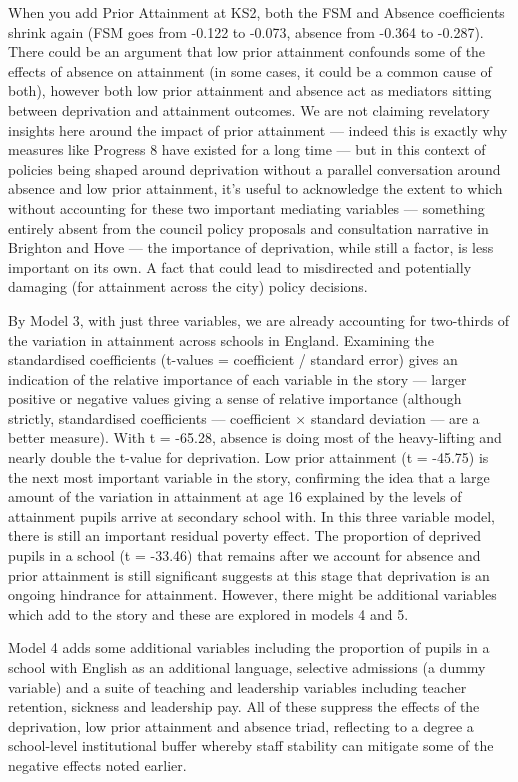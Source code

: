 \documentclass[
  11pt,
]{article}
\begin{document}
When you add Prior Attainment at KS2, both the FSM and Absence
coefficients shrink again (FSM goes from -0.122 to -0.073, absence from
-0.364 to -0.287). There could be an argument that low prior attainment
confounds some of the effects of absence on attainment (in some cases,
it could be a common cause of both), however both low prior attainment
and absence act as mediators sitting between deprivation and attainment
outcomes. We are not claiming revelatory insights here around the impact
of prior attainment --- indeed this is exactly why measures like
Progress 8 have existed for a long time --- but in this context of
policies being shaped around deprivation without a parallel conversation
around absence and low prior attainment, it's useful to acknowledge the
extent to which without accounting for these two important mediating
variables --- something entirely absent from the council policy
proposals and consultation narrative in Brighton and Hove --- the
importance of deprivation, while still a factor, is less important on
its own. A fact that could lead to misdirected and potentially damaging
(for attainment across the city) policy decisions.

By Model 3, with just three variables, we are already accounting for
two-thirds of the variation in attainment across schools in England.
Examining the standardised coefficients (t-values = coefficient /
standard error) gives an indication of the relative importance of each
variable in the story --- larger positive or negative values giving a
sense of relative importance (although strictly, standardised
coefficients --- coefficient × standard deviation --- are a better
measure). With t = -65.28, absence is doing most of the heavy-lifting
and nearly double the t-value for deprivation. Low prior attainment (t =
-45.75) is the next most important variable in the story, confirming the
idea that a large amount of the variation in attainment at age 16
explained by the levels of attainment pupils arrive at secondary school
with. In this three variable model, there is still an important residual
poverty effect. The proportion of deprived pupils in a school (t =
-33.46) that remains after we account for absence and prior attainment
is still significant suggests at this stage that deprivation is an
ongoing hindrance for attainment. However, there might be additional
variables which add to the story and these are explored in models 4 and
5.

Model 4 adds some additional variables including the proportion of
pupils in a school with English as an additional language, selective
admissions (a dummy variable) and a suite of teaching and leadership
variables including teacher retention, sickness and leadership pay. All
of these suppress the effects of the deprivation, low prior attainment
and absence triad, reflecting to a degree a school-level institutional
buffer whereby staff stability can mitigate some of the negative effects
noted earlier.
\end{document}
